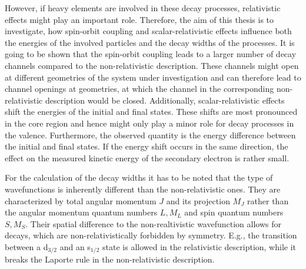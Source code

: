 However, if heavy elements are involved in these decay processes, relativistic
effects might play an important role. Therefore, the aim of this
thesis is to investigate, how spin-orbit coupling and scalar-relativistic
effects influence both the energies of the involved particles and the
decay widths of the processes.
It is going to be shown that the spin-orbit coupling leads to a larger number
of decay channels compared to the non-relativistic description. These channels
might open at different geometries of the system under investigation and
can therefore lead to channel openings at geometries, at which the channel
in the corresponding non-relativistic description would be closed. Additionally,
scalar-relativistic effects shift the energies of the initial and final states.
These shifts are most pronounced in the core region and hence might only play
a minor role for decay processes in the valence. Furthermore, the observed
quantity is the energy difference between the initial and final states. If the
energy shift occurs in the same direction, the effect on the measured kinetic
energy of the secondary electron is rather small.

For the calculation of the decay widths it has to be noted that the type of
wavefunctions is inherently different than the non-relativistic ones. They
are characterized by total angular momentum $J$ and its projection $M_J$ rather
than the angular momentum quantum numbers $L,M_L$ and spin quantum numbers
$S,M_S$. Their spatial difference to the non-realtivistic wavefunction allows
for decays, which are non-relativistically forbidden by symmetry. E.g., the
transition between a d$_{3/2}$ and an s$_{1/2}$ state is allowed in the
relativistic description, while it breaks the Laporte rule in the non-relativistic
description.

